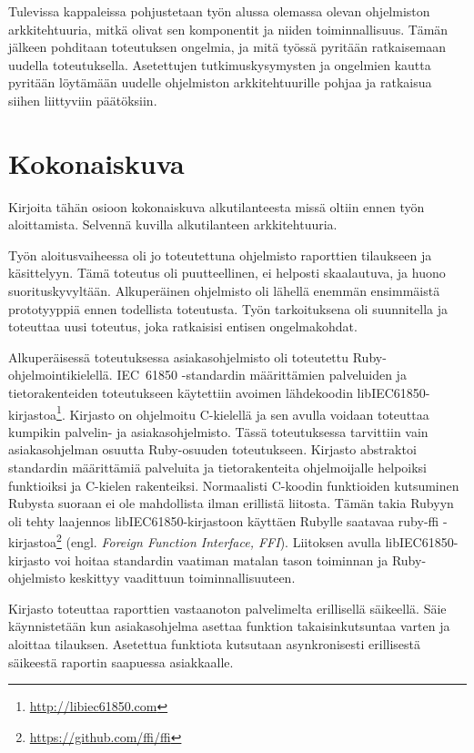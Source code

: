 Tulevissa kappaleissa pohjustetaan työn alussa olemassa olevan ohjelmiston arkkitehtuuria, mitkä olivat sen komponentit ja niiden toiminnallisuus. Tämän jälkeen pohditaan toteutuksen ongelmia, ja mitä työssä pyritään ratkaisemaan uudella toteutuksella. Asetettujen tutkimuskysymysten ja ongelmien kautta pyritään löytämään uudelle ohjelmiston arkkitehtuurille pohjaa ja ratkaisua siihen liittyviin päätöksiin.

\section{Kokonaiskuva}
\begin{it}
	Kirjoita tähän osioon kokonaiskuva alkutilanteesta missä oltiin ennen työn aloittamista. Selvennä kuvilla alkutilanteen arkkitehtuuria.
\end{it}

Työn aloitusvaiheessa oli jo toteutettuna ohjelmisto raporttien tilaukseen ja käsittelyyn. Tämä toteutus oli puutteellinen, ei helposti skaalautuva, ja huono suorituskyvyltään. Alkuperäinen ohjelmisto oli lähellä enemmän ensimmäistä prototyyppiä ennen todellista toteutusta. Työn tarkoituksena oli suunnitella ja toteuttaa uusi toteutus, joka ratkaisisi entisen ongelmakohdat.

Alkuperäisessä toteutuksessa asiakasohjelmisto oli toteutettu Ruby-ohjelmointikielellä. IEC~61850 -standardin määrittämien palveluiden ja tietorakenteiden toteutukseen käytettiin avoimen lähdekoodin libIEC61850-kirjastoa\footnote{\url{http://libiec61850.com}}. Kirjasto on ohjelmoitu C-kielellä ja sen avulla voidaan toteuttaa kumpikin palvelin- ja asiakasohjelmisto. Tässä toteutuksessa tarvittiin vain asiakasohjelman osuutta Ruby-osuuden toteutukseen. Kirjasto abstraktoi standardin määrittämiä palveluita ja tietorakenteita ohjelmoijalle helpoiksi funktioiksi ja C-kielen rakenteiksi. Normaalisti C-koodin funktioiden kutsuminen Rubysta suoraan ei ole mahdollista ilman erillistä liitosta. Tämän takia Rubyyn oli tehty laajennos libIEC61850-kirjastoon käyttäen Rubylle saatavaa ruby-ffi -kirjastoa\footnote{\url{https://github.com/ffi/ffi}} (engl. \emph{Foreign Function Interface, FFI}). Liitoksen avulla libIEC61850-kirjasto voi hoitaa standardin vaatiman matalan tason toiminnan ja Ruby-ohjelmisto keskittyy vaadittuun toiminnallisuuteen.

Kirjasto toteuttaa raporttien vastaanoton palvelimelta erillisellä säikeellä. Säie käynnistetään kun asiakasohjelma asettaa funktion takaisinkutsuntaa varten ja aloittaa tilauksen. Asetettua funktiota kutsutaan asynkronisesti erillisestä säikeestä raportin saapuessa asiakkaalle.

